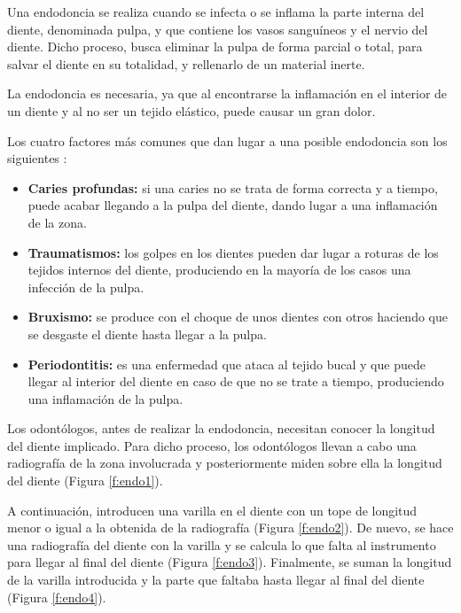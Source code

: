 
Una endodoncia \cite{soares2002endodoncia} se realiza cuando se infecta o se inflama la parte interna del diente, denominada pulpa, y que contiene los vasos sanguíneos y el nervio del diente. Dicho proceso, busca eliminar la pulpa de forma parcial o total, para salvar el diente en su totalidad, y rellenarlo de un material inerte.

La endodoncia es necesaria, ya que al encontrarse la inflamación en el interior de un diente y al no ser un tejido elástico, puede causar un gran dolor.

Los cuatro factores más comunes que dan lugar a una posible endodoncia son los siguientes \cite{causas2020}:
\begin{itemize}
    \item \textbf{Caries profundas:} si una caries no se trata de forma correcta y a tiempo, puede acabar llegando a la pulpa del diente, dando lugar a una inflamación de la zona.
    \item \textbf{Traumatismos:} los golpes en los dientes pueden dar lugar a roturas de los tejidos internos del diente, produciendo en la mayoría de los casos una infección de la pulpa.
    \item \textbf{Bruxismo:} se produce con el choque de unos dientes con otros haciendo que se desgaste el diente hasta llegar a la pulpa.
    \item \textbf{Periodontitis:} es una enfermedad que ataca al tejido bucal y que puede llegar al interior del diente en caso de que no se trate a tiempo, produciendo una inflamación de la pulpa.
\end{itemize}

Los odontólogos, antes de realizar la endodoncia, necesitan conocer la longitud del diente implicado. Para dicho proceso, los odontólogos llevan a cabo una radiografía de la zona involucrada y posteriormente miden sobre ella la longitud del diente (Figura \ref{f:endo1}). 

A continuación, introducen una varilla en el diente con un tope de longitud menor o igual a la obtenida de la radiografía (Figura \ref{f:endo2}). De nuevo, se hace una radiografía del diente con la varilla y se calcula lo que falta al instrumento para llegar al final del diente (Figura \ref{f:endo3}). Finalmente, se suman la longitud de la varilla introducida y la parte que faltaba hasta llegar al final del diente (Figura \ref{f:endo4}).

